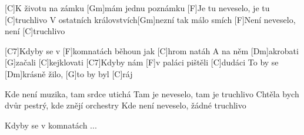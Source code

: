 
[C]K životu na zámku [Gm]mám jednu poznámku 
[F]Je tu neveselo, je tu [C]truchlivo
V ostatních královstvích[Gm]nezní tak málo smích
[F]Není neveselo, není [C]truchlivo

[C7]Kdyby se v [F]komnatách běhoun jak [C]hrom natáh
A na něm [Dm]akrobati [G]začali [C]kejklovati
[C7]Kdyby nám [F]v paláci pištěli [C]dudáci 
To by se [Dm]krásně žilo, [G]to by byl [C]ráj

Kde není muzika, tam srdce utichá
Tam je neveselo, tam je truchlivo
Chtěla bych dvůr pestrý, kde znějí orchestry
Kde není neveselo, žádné truchlivo

Kdyby se v komnatách ... 
